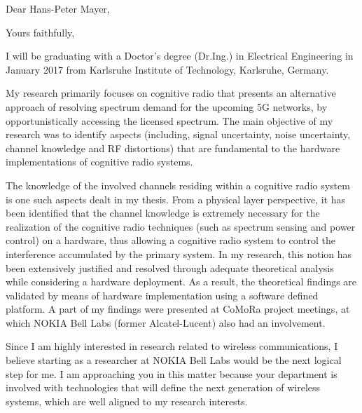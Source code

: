 \documentclass[11pt,a4paper,sans]{moderncv}        %
\begin{document}
\date{\today}
\opening{Dear Hans-Peter Mayer,}
\closing{Yours faithfully,}
\makelettertitle
I will be graduating with a Doctor's degree (Dr.Ing.) in Electrical Engineering in January 2017 from Karlsruhe Institute of Technology, Karlsruhe, Germany. 

My research primarily focuses on cognitive radio that presents an alternative approach of resolving spectrum demand for the upcoming 5G networks, by opportunistically accessing the licensed spectrum. The main objective of my research was to identify aspects (including, signal uncertainty, noise uncertainty, channel knowledge and RF distortions) that are fundamental to the hardware implementations of cognitive radio systems. 

The knowledge of the involved channels residing within a cognitive radio system is one such aspects dealt in my thesis. From a physical layer perspective, it has been identified that the channel knowledge is extremely necessary for the realization of the cognitive radio techniques (such as spectrum sensing and power control) on a hardware, thus allowing a cognitive radio system to control the interference accumulated by the primary system. In my research, this notion has been extensively justified and resolved through adequate theoretical analysis while considering a hardware deployment. As a result, the theoretical findings are validated by means of hardware implementation using a software defined platform. A part of my findings were presented at CoMoRa project meetings, at which NOKIA Bell Labs (former Alcatel-Lucent) also had an involvement.   

Since I am highly interested in research related to wireless communications, I believe starting as a researcher at NOKIA Bell Labs would be the next logical step for me. I am approaching you in this matter because your department is involved with technologies that will define the next generation of wireless systems, which are well aligned to my research interests. 
\end{document}
